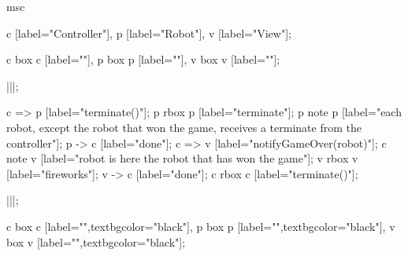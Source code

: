 \begin{msc}
msc
{

c [label="Controller"],
p [label="Robot"],
v [label="View"];

c box c [label=""],
p box p [label=""],
v box v [label=""];

|||;

c => p [label="terminate()"];
p rbox p [label="terminate"];
p note p [label="each robot, except the robot that won the game, receives a terminate from the controller"];
p -> c [label="done"];
c => v [label="notifyGameOver(robot)"];
c note v [label="robot is here the robot that has won the game"];
v rbox v [label="fireworks"];
v -> c [label="done"];
c rbox c [label="terminate()"];

|||;

c box c [label="",textbgcolor="black"],
p box p [label="",textbgcolor="black"],
v box v [label="",textbgcolor="black"];

}
\end{msc}
